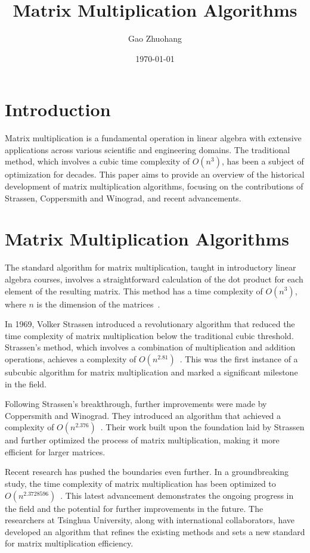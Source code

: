 \documentclass{article}
\title{Matrix Multiplication Algorithms}
\author{Gao Zhuohang}
\date{\today}
\begin{document}
\maketitle

\section{Introduction}
Matrix multiplication is a fundamental operation in linear algebra with extensive applications across various scientific and engineering domains. The traditional method, which involves a cubic time complexity of $O(n^3)$, has been a subject of optimization for decades. This paper aims to provide an overview of the historical development of matrix multiplication algorithms, focusing on the contributions of Strassen, Coppersmith and Winograd, and recent advancements.

\section{Matrix Multiplication Algorithms}\label{sec::algorithms}

The standard algorithm for matrix multiplication, taught in introductory linear algebra courses, involves a straightforward calculation of the dot product for each element of the resulting matrix. This method has a time complexity of $O(n^3)$, where $n$ is the dimension of the matrices~\cite{strang2006}.

In 1969, Volker Strassen introduced a revolutionary algorithm that reduced the time complexity of matrix multiplication below the traditional cubic threshold. Strassen's method, which involves a combination of multiplication and addition operations, achieves a complexity of $O(n^{2.81})$~\cite{strassen1969}. This was the first instance of a subcubic algorithm for matrix multiplication and marked a significant milestone in the field.

Following Strassen's breakthrough, further improvements were made by Coppersmith and Winograd. They introduced an algorithm that achieved a complexity of $O(n^{2.376})$~\cite{coppersmith1987}. Their work built upon the foundation laid by Strassen and further optimized the process of matrix multiplication, making it more efficient for larger matrices.

Recent research has pushed the boundaries even further. In a groundbreaking study, the time complexity of matrix multiplication has been optimized to $O(n^{2.3728596})$~\cite{duan2023faster}. This latest advancement demonstrates the ongoing progress in the field and the potential for further improvements in the future. The researchers at Tsinghua University, along with international collaborators, have developed an algorithm that refines the existing methods and sets a new standard for matrix multiplication efficiency.
\end{document}
